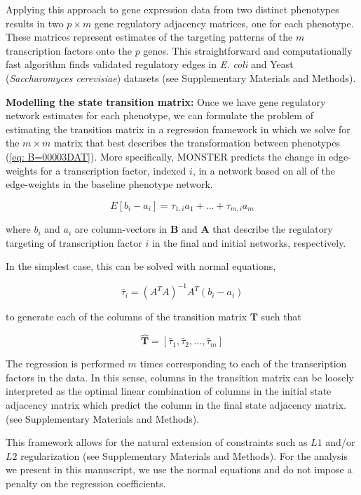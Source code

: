 \documentclass[9pt,twocolumn,twoside]{pnas-new}
\begin{document}
Applying this approach to gene expression data from two distinct phenotypes
results in two $p\times m$ gene regulatory adjacency matrices, one
for each phenotype. These matrices represent estimates of the targeting
patterns of the $m$ transcription factors onto the $p$ genes. This
straightforward and computationally fast algorithm finds validated
regulatory edges in \emph{E. coli} and Yeast (\emph{Saccharomyces
cerevisiae}) datasets (see Supplementary Materials and Methods).

\textbf{Modelling the state transition matrix:} Once we have gene
regulatory network estimates for each phenotype, we can formulate
the problem of estimating the transition matrix in a regression framework
in which we solve for the $m\times m$ matrix that best describes
the transformation between phenotypes (\ref{eq: B=00003DAT}). More
specifically, MONSTER predicts the change in edge-weights for a transcription
factor, indexed $i$, in a network based on all of the edge-weights
in the baseline phenotype network.

\[
E[b_{i}-a_{i}]=\tau_{1,i}a_{1}+\dots+\tau_{m,i}a_{m}
\]

where $b_{i}$ and $a_{i}$ are column-vectors in $\mathbf{B}$ and
$\mathbf{A}$ that describe the regulatory targeting of transcription
factor $i$ in the final and initial networks, respectively. 

In the simplest case, this can be solved with normal equations,

\[
\hat{\tau}_{i}=\left(A^{T}A\right)^{-1}A^{T}(b_{i}-a_{i})
\]

to generate each of the columns of the transition matrix $\mathbf{T}$
such that 

\[
\hat{\mathbf{T}}=\left[\hat{\tau}_{1},\hat{\tau}_{2},\dots,\hat{\tau}_{m}\right]
\]

The regression is performed $m$ times corresponding to each of the
transcription factors in the data. In this sense, columns in the transition
matrix can be loosely interpreted as the optimal linear combination
of columns in the initial state adjacency matrix which predict the
column in the final state adjacency matrix. (see Supplementary Materials
and Methods). 

This framework allows for the natural extension of constraints such
as $L1$ and/or $L2$ regularization (see Supplementary Materials
and Methods). For the analysis we present in this manuscript, we use
the normal equations and do not impose a penalty on the regression
coefficients.
\end{document}
